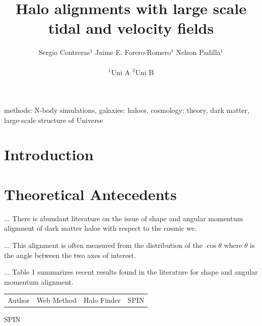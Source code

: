 \documentclass[usenatbib]{mn2e}
\begin{document}
\title[Vweb \& Tweb]{Halo alignments with large scale tidal and
  velocity fields} 
\author[S. Contreras et al.]{
\parbox[t]{\textwidth}{\raggedright 
  Sergio Contreras$^{1}$ 
  Jaime E. Forero-Romero$^{1}$ 
  Nelson Padilla$^{1}$ 
}
\vspace*{6pt}\\
$^{1}$Uni A
$^{2}$Uni B
}
\maketitle

\begin{abstract}

\end{abstract}
\begin{keywords}
methods: N-body simulations, galaxies: haloes, cosmology: theory, dark
matter, large-scale structure of Universe 
\end{keywords}


\section{Introduction}
\label{sec:introduction}


\section{Theoretical Antecedents}
\label{sec:theory}

... There is abundant literature on the issue of shape and angular momentum
aligmnent of dark matter haloe with respect to the cosmic we.

... This alignment is often measured from the distribution of the
$\cos\theta$ where $\theta$ is the angle between the two axes of
interest.

... Table 1 summarizes recent results found in the literature for
shape and angular momentum alignment.






\citep{Faltenbacher2009} %
\citep{Paz2008} %
\citep{Platen2008} %
\citep{Lee2007}%


\begin{table}
\begin{tabular}{llll}
Author & Web Method & Halo Finder & SPIN \\
\end{tabular}
SPIN
\end{table}
\end{document}
